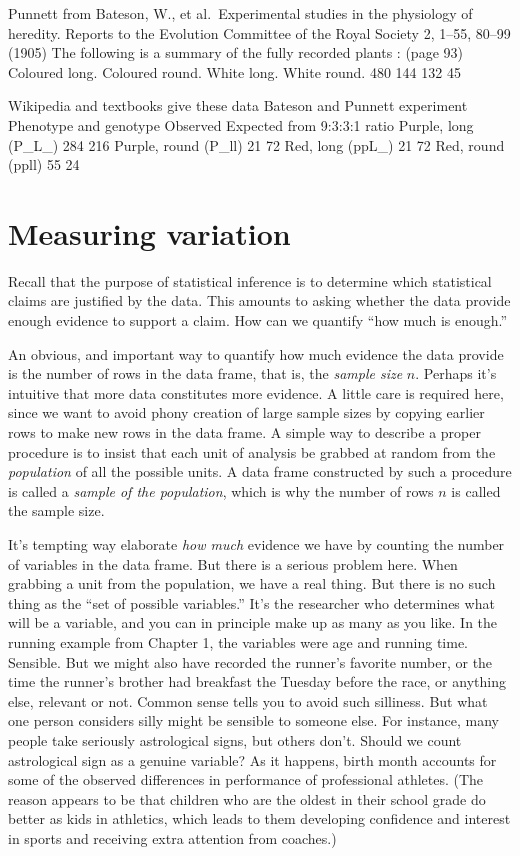 \documentclass[]{book}
\begin{document}
Punnett from Bateson, W., et al.~Experimental studies in the physiology of heredity. Reports to the Evolution Committee of the Royal Society 2, 1--55, 80--99 (1905)
The following is a summary of the fully recorded plants : (page 93)
Coloured long. Coloured round. White long. White round. 480 144 132 45

Wikipedia and textbooks give these data
Bateson and Punnett experiment
Phenotype and genotype Observed Expected from 9:3:3:1 ratio
Purple, long (P\_L\_) 284 216
Purple, round (P\_ll) 21 72
Red, long (ppL\_) 21 72
Red, round (ppll) 55 24

\hypertarget{measuring-variation}{%
\chapter{Measuring variation}\label{measuring-variation}}

Recall that the purpose of statistical inference is to determine which statistical claims are justified by the data. This amounts to asking whether the data provide enough evidence to support a claim. How can we quantify ``how much is enough.''

An obvious, and important way to quantify how much evidence the data provide is the number of rows in the data frame, that is, the \emph{sample size} \(n\). Perhaps it's intuitive that more data constitutes more evidence. A little care is required here, since we want to avoid phony creation of large sample sizes by copying earlier rows to make new rows in the data frame. A simple way to describe a proper procedure is to insist that each unit of analysis be grabbed at random from the \emph{population} of all the possible units. A data frame constructed by such a procedure is called a \emph{sample of the population}, which is why the number of rows \(n\) is called the sample size.

It's tempting way elaborate \emph{how much} evidence we have by counting the number of variables in the data frame. But there is a serious problem here. When grabbing a unit from the population, we have a real thing. But there is no such thing as the ``set of possible variables.'' It's the researcher who determines what will be a variable, and you can in principle make up as many as you like. In the running example from Chapter 1, the variables were age and running time. Sensible. But we might also have recorded the runner's favorite number, or the time the runner's brother had breakfast the Tuesday before the race, or anything else, relevant or not. Common sense tells you to avoid such silliness. But what one person considers silly might be sensible to someone else. For instance, many people take seriously astrological signs, but others don't. Should we count astrological sign as a genuine variable? As it happens, birth month accounts for some of the observed differences in performance of professional athletes. (The reason appears to be that children who are the oldest in their school grade do better as kids in athletics, which leads to them developing confidence and interest in sports and receiving extra attention from coaches.)
\end{document}
